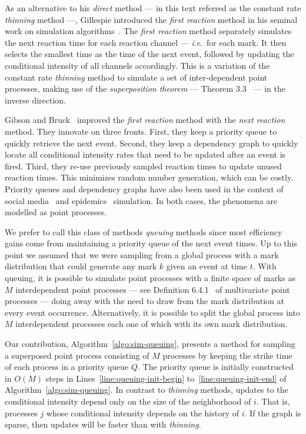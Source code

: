 \documentclass{juliacon}
\numberwithin{equation}{section}
\newcommand{\ie}{\textit{i}.\textit{e}.}
\begin{document}
As an alternative to his \textit{direct} method --- in this text referred as the constant rate \textit{thinning} method ---, Gillespie introduced the \textit{first reaction} method in his seminal work on simulation algorithms~\cite{gillespie1976}. The \textit{first reaction} method separately simulates the next reaction time for each reaction channel --- \ie~for each mark. It then selects the smallest time as the time of the next event, followed by updating the conditional intensity of all channels accordingly. This is a variation of the constant rate \textit{thinning} method to simulate a set of inter-dependent point processes, making use of the \textit{superposition theorem} --- Theorem 3.3~\cite{last2017} --- in the inverse direction.

Gibson and Bruck~\cite{gibson2000} improved the \textit{first reaction} method with the \textit{next reaction} method. They innovate on three fronts. First, they keep a priority queue to quickly retrieve the next event. Second, they keep a dependency graph to quickly locate all conditional intensity rates that need to be updated after an event is fired. Third, they re-use previously sampled reaction times to update unused reaction times. This minimizes random number generation, which can be costly. Priority queues and dependency graphs have also been used in the context of social media~\cite{farajtabar2017} and epidemics~\cite{holme2021} simulation. In both cases, the phenomena are modelled as point processes.

We prefer to call this class of methods \textit{queuing} methods since most efficiency gains come from maintaining a priority queue of the next event times. Up to this point we assumed that we were sampling from a global process with a mark distribution that could generate any mark \( k \) given an event at time \( t \). With queuing, it is possible to simulate point processes with a finite space of marks as \( M \) interdependent point processes --- see Definition 6.4.1~\cite{daley2003} of multivariate point processes --- doing away with the need to draw from the mark distribution at every event occurrence. Alternatively, it is possible to split the global process into \( M \) interdependent processes each one of which with its own mark distribution.

Our contribution, Algorithm~\ref{algo:sim-queuing}, presents a method for sampling a superposed point process consisting of \( M \) processes by keeping the strike time of each process in a priority queue \( Q \). The priority queue is initially constructed in \( O(M) \) steps in Lines~\ref{line:queuing-init-begin} to~\ref{line:queuing-init-end} of Algorithm~\ref{algo:sim-queuing}. In contrast to \textit{thinning} methods, updates to the conditional intensity depend only on the size of the neighborhood of \( i \). That is, processes \( j \) whose conditional intensity depends on the history of \( i \). If the graph is sparse, then updates will be faster than with \textit{thinning}.
\end{document}
